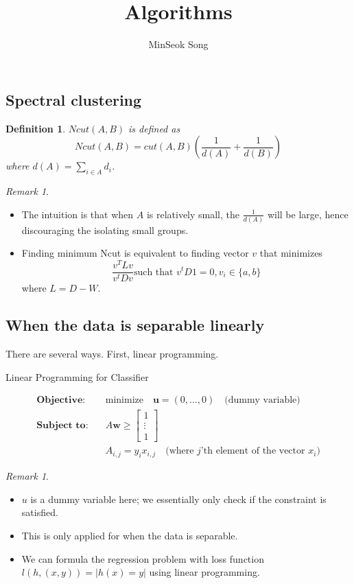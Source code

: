 \documentclass{article}
\title{Algorithms}
\author{MinSeok Song}
\date{}
\newtheorem{definition}{Definition}
\theoremstyle{remark}
\newtheorem{remark}[example]{Remark}
\begin{document}
\maketitle
\subsection*{Spectral clustering}
\begin{definition}
$Ncut(A,B)$ is defined as $$Ncut(A,B) = cut(A,B)(\frac 1{d(A)}+\frac 1{d(B)})$$ where $d(A)=\sum_{i\in A}d_i$.
\end{definition}
\begin{remark}
\begin{itemize}
\item The intuition is that when $A$ is relatively small, the $\frac 1{d(A)}$ will be large, hence discouraging the isolating small groups.
\item Finding minimum Ncut is equivalent to finding vector $v$ that minimizes $$\frac{v^T Lv}{v^tDv}\text{such that }v^tD1=0,v_i\in\{a,b\}$$ where 
$L=D-W$.

\end{itemize}
\end{remark}

\subsection*{When the data is separable linearly}
There are several ways. First, linear programming.
\begin{algorithm}[H]
        \caption{Linear Programming for Classifier}
        \begin{align*}
        \textbf{Objective:} \quad & \text{minimize} \quad \mathbf{u} = (0, \ldots, 0) \quad \text{(dummy variable)} \\
        \textbf{Subject to:} \quad & A\mathbf{w} \geq \begin{bmatrix} 1 \\ \vdots \\ 1 \end{bmatrix} \\
        & A_{i,j} = y_i x_{i,j} \quad \text{(where \(j\)'th element of the vector \(x_i\))}
\end{align*}
\end{algorithm}
\begin{remark}
\begin{itemize}
\item $u$ is a dummy variable here; we essentially only check if the constraint is satisfied.
\item This is only applied for when the data is separable.
\item We can formula the regression problem with loss function $l(h, (x,y))=\lvert h(x)=y\rvert$ using linear programming.
\end{itemize}
\end{remark}
\end{document}
